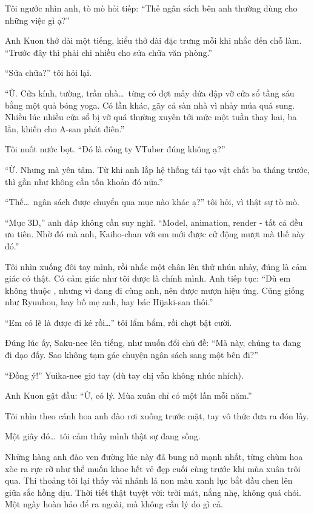 \documentclass[../main.tex]{subfiles}
\begin{document}
Tôi ngước nhìn anh, tò mò hỏi tiếp: ``Thế ngân sách bên anh thường dùng cho những việc gì ạ?''

Anh Kuon thở dài một tiếng, kiểu thở dài đặc trưng mỗi khi nhắc đến chỗ làm. ``Trước đây thì phải chi nhiều cho sửa chữa văn phòng.''

``Sửa chữa?'' tôi hỏi lại.

``Ừ. Cửa kính, tường, trần nhà\dots\ từng có đợt mấy đứa đập vỡ cửa sổ tầng sáu bằng một quả bóng yoga. Có lần khác, gãy cả sàn nhà vì nhảy múa quá sung. Nhiều lúc nhiều cửa sổ bị vỡ quá thường xuyên tới mức một tuần thay hai, ba lần, khiến cho A-san phát điên.''

Tôi nuốt nước bọt. ``Đó là công ty VTuber đúng không ạ?''

``Ừ. Nhưng mà yên tâm. Từ khi anh lắp hệ thống tái tạo vật chất ba tháng trước, thì gần như không cần tốn khoản đó nữa.''

``Thế\dots\ ngân sách được chuyển qua mục nào khác ạ?'' tôi hỏi, vì thật sự tò mò.

``Mục 3D,'' anh đáp không cần suy nghĩ. ``Model, animation, render - tất cả đều ưu tiên. Nhờ đó mà anh, Kaiho-chan với em mới được cử động mượt mà thế này đó.''

Tôi nhìn xuống đôi tay mình, rồi nhấc một chân lên thử nhún nhảy, đúng là cảm giác có thật. Có cảm giác như tôi được là chính mình. Anh tiếp tục: ``Dù em không thuộc \hll, nhưng vì đang đi cùng anh, nên được mượn hiệu ứng. Cũng giống như Ryuuhou, hay bố mẹ anh, hay bác Hijaki-san thôi.''

``Em có lẽ là được đi ké rồi\dots'' tôi lẩm bẩm, rồi chợt bật cười.

Đúng lúc ấy, Saku-nee lên tiếng, như muốn đổi chủ đề: ``Mà này, chúng ta đang đi dạo đấy. Sao không tạm gác chuyện ngân sách sang một bên đi?''

``Đồng ý!'' Yuika-nee giơ tay (dù tay chị vẫn không nhúc nhích).

Anh Kuon gật đầu: ``Ừ, có lý. Mùa xuân chỉ có một lần mỗi năm.''

Tôi nhìn theo cánh hoa anh đào rơi xuống trước mặt, tay vô thức đưa ra đón lấy.

Một giây đó\dots\ tôi cảm thấy mình thật sự đang sống.

\ct

Những hàng anh đào ven đường lúc này đã bung nở mạnh nhất, từng chùm hoa xòe ra rực rỡ như thể muốn khoe hết vẻ đẹp cuối cùng trước khi mùa xuân trôi qua. Thi thoảng tôi lại thấy vài nhánh lá non màu xanh lục bắt đầu chen lên giữa sắc hồng dịu. Thời tiết thật tuyệt vời: trời mát, nắng nhẹ, không quá chói. Một ngày hoàn hảo để ra ngoài, mà không cần lý do gì cả.
\end{document}
